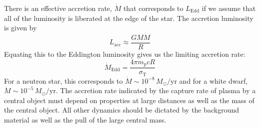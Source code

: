 \documentclass[10pt]{article}
\numberwithin{equation}{section}
\newcommand{\n}{\noindent}
\begin{document}
		\n There is an effective accretion rate, $\dot{M}$ that corresponds to $L_{\mathrm{Edd}}$ if we assume that all of the luminosity is liberated at the edge of the star. The accretion luminosity is given by
		\begin{equation}
			\label{eq:acc:8} L_{\mathrm{acc}} \approx \frac{GM\dot{M}}{R}
		\end{equation}
		Equating this to the Eddington luminosity gives us the limiting accretion rate:
		\begin{equation}
			\label{eq:acc:9} \dot{M}_{\mathrm{Edd}} = \frac{4\pi m_p c R}{\sigma_{\mathrm{T}}}
		\end{equation}
		For a neutron star, this corresponds to $\dot{M}\sim 10^{-8}\,M_\odot/\mathrm{yr}$ and for a white dwarf, $\dot{M}\sim 10^{-5}\,M_\odot/\mathrm{yr}$. The accretion rate indicated by the capture rate of plasma by a central object must depend on properties at large distances as well as the mass of the central object. All other dynamics should be dictated by the background material as well as the pull of the large central mass.\\
		
\end{document}

